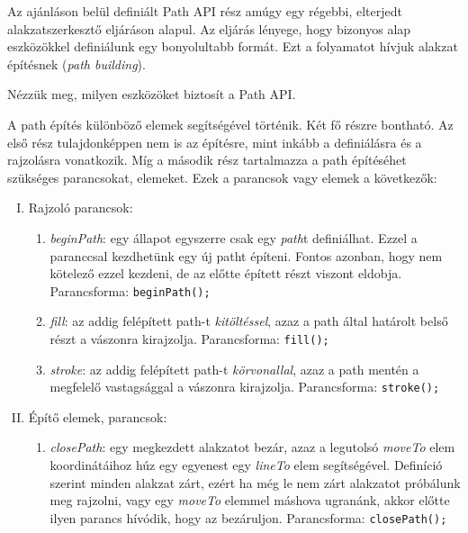 \documentclass[12pt]{report}
\theoremstyle{definition}
\newcommand{\inenglish}[1]{\textsl{#1}}
\begin{document}
  Az ajánláson belül definiált Path API rész amúgy egy régebbi, elterjedt
alakzatszerkesztő eljáráson alapul. Az eljárás lényege, hogy bizonyos alap
eszközökkel definiálunk egy bonyolultabb formát. Ezt a folyamatot hívjuk
alakzat építésnek (\inenglish{path building}).

  Nézzük meg, milyen eszközöket biztosít a Path API.


A path építés
különböző elemek segítségével történik. Két fő részre bontható. Az első rész
tulajdonképpen nem is az építésre, mint inkább a definiálásra és a rajzolásra
vonatkozik. Míg a második rész tartalmazza a path építéséhet szükséges
parancsokat, elemeket. Ezek a parancsok vagy elemek a következők:

\begin{enumerate}[I.]
  \item Rajzoló parancsok:
    \begin{enumerate}
      \item \emph{beginPath}: egy állapot egyszerre csak egy
      \emph{path}t definiálhat. Ezzel a paranccsal kezdhetünk egy új
      patht építeni. Fontos azonban, hogy nem kötelező ezzel
      kezdeni, de az előtte épített részt viszont eldobja.
      Parancsforma:\newline
        \texttt{beginPath();}
      \item \emph{fill}: az addig felépített path-t
      \emph{kitöltéssel}, azaz a path által határolt belső részt
      a vászonra kirajzolja. Parancsforma:\newline
        \texttt{fill();}
      \item \emph{stroke}: az addig felépített path-t
      \emph{körvonallal}, azaz a path mentén a megfelelő
      vastagsággal a vászonra kirajzolja. Parancsforma:\newline
        \texttt{stroke();}
    \end{enumerate}
  \item Építő elemek, parancsok:
    \begin{enumerate}
      \item \emph{closePath}: egy megkezdett alakzatot bezár, azaz
      a legutolsó \emph{moveTo} elem koordinátáihoz húz egy
      egyenest egy \emph{lineTo} elem segítségével. Definíció
      szerint minden alakzat zárt, ezért ha még le nem zárt
      alakzatot próbálunk meg rajzolni, vagy egy \emph{moveTo}
      elemmel máshova ugranánk, akkor előtte ilyen parancs
      hívódik, hogy az bezáruljon.
      Parancsforma:\newline
        \texttt{closePath();}

\end{enumerate}
\end{enumerate}
\end{document}
